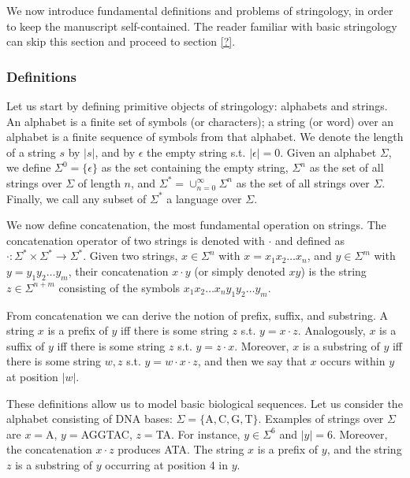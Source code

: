 We now introduce fundamental definitions and problems of stringology, in order to keep the manuscript self-contained.
The reader familiar with basic stringology can skip this section and proceed to section \ref{?}.

\subsubsection{Definitions}

Let us start by defining primitive objects of stringology: alphabets and strings.
An alphabet is a finite set of symbols (or characters); a string (or word) over an alphabet is a finite sequence of symbols from that alphabet.
We denote the length of a string $s$ by $\left| s \right|$, and by $\epsilon$ the empty string s.t. $\left| \epsilon \right|=0$.
Given an alphabet $\Sigma$, we define $\Sigma^0=\{ \epsilon \}$ as the set containing the empty string, $\Sigma^n$ as the set of all strings over $\Sigma$ of length $n$, and $\Sigma^* = \cup_{n=0}^{\infty}{\Sigma^n}$ as the set of all strings over $\Sigma$.
Finally, we call any subset of $\Sigma^*$ a language over $\Sigma$.

We now define concatenation, the most fundamental operation on strings.
The concatenation operator of two strings is denoted with $\cdot$ and defined as $\cdot : \Sigma^* \times \Sigma^* \rightarrow \Sigma^*$.
Given two strings, $x \in \Sigma^n$ with $x=x_1 x_2 \dots x_n$, and $y \in \Sigma^m$ with $y=y_1 y_2 \dots y_m$, their concatenation $x \cdot y$ (or simply denoted $xy$) is the string $z \in \Sigma^{n+m}$ consisting of the symbols $x_1 x_2 \dots x_n y_1 y_2 \dots y_m$.

From concatenation we can derive the notion of prefix, suffix, and substring.
A string $x$ is a prefix of $y$ iff there is some string $z$ s.t. $y=x\cdot z$.
Analogously, $x$ is a suffix of $y$ iff there is some string $z$ s.t. $y=z\cdot x$.
Moreover, $x$ is a substring of $y$ iff there is some string $w,z$ s.t. $y=w\cdot x \cdot z$, and then we say that $x$ occurs within $y$ at position $|w|$.

\begin{example}
These definitions allow us to model basic biological sequences.
Let us consider the alphabet consisting of DNA bases: $\Sigma = \{\text{A},\text{C},\text{G},\text{T}\}$.
Examples of strings over $\Sigma$ are $x=$A, $y=$AGGTAC, $z=$TA.
For instance, $y \in \Sigma^6$ and $\left| y \right| = 6$.
Moreover, the concatenation $x \cdot z$ produces ATA.
The string $x$ is a prefix of $y$, and the string $z$ is a substring of $y$  occurring at position 4 in $y$.
\end{example}

